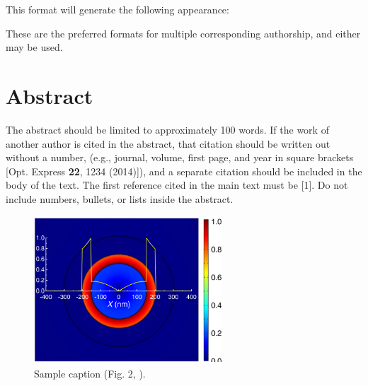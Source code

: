 \documentclass{osa-article}
\begin{document}
This format will generate the following appearance:

\medskip

\author{Author One and Author Two}

\address{Peer Review, Publications Department,
Optical Society of America, 2010 Massachusetts Avenue NW, Washington, DC 20036, USA\\
Publications Department, Optical Society of America, 2010 Massachusetts Avenue NW, Washington, DC 20036, USA\\
xyz@osa.org\\
opex@osa.org}
\medskip
These are the preferred
formats for multiple corresponding authorship, and either may be used.

\section{Abstract}
The abstract should be limited to approximately 100 words.
If the work of another author is cited in the abstract, that citation should be written out without a number, (e.g., journal, volume, first page, and year in square brackets [Opt. Express {\bfseries 22}, 1234 (2014)]), and a separate citation should be included in the body of the text. The first reference cited in the main text must be [1]. Do not include numbers, bullets, or lists inside the abstract.

\begin{figure}[h!]
\centering\includegraphics[width=7cm]{osafig1}
\caption{Sample caption (Fig. 2, \cite{Yelin:03}).}
\end{figure}
\end{document}
